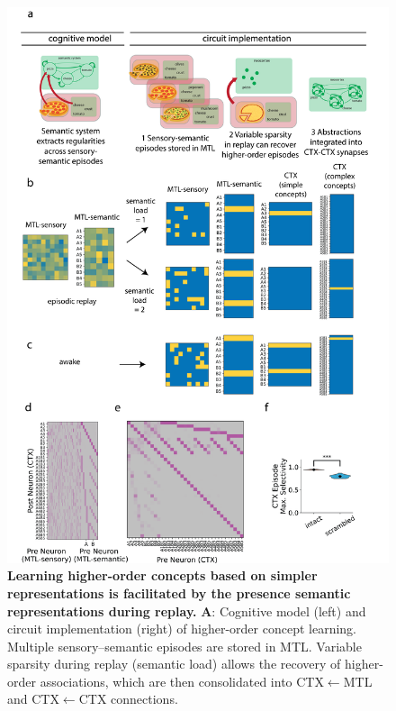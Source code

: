 \documentclass{article}
\begin{document}
\begin{figure}[h!]
    \centering
    \includegraphics[width=0.95\linewidth]{Figures/Figure_7.png}
\caption{\textbf{Learning higher-order concepts based on simpler representations is facilitated by the presence semantic representations during replay.} \textbf{A}: Cognitive model (left) and circuit implementation (right) of higher-order concept learning. Multiple sensory–semantic episodes are stored in MTL. Variable sparsity during replay (semantic load) allows the recovery of higher-order associations, which are then consolidated into CTX$\leftarrow$MTL and  CTX$\leftarrow$CTX connections.}
    \label{fig:higher-order}
\end{figure}
\end{document}
